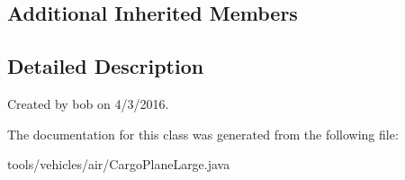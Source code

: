 \subsection*{Additional Inherited Members}


\subsection{Detailed Description}
Created by bob on 4/3/2016. 

The documentation for this class was generated from the following file\+:\begin{DoxyCompactItemize}
\item 
tools/vehicles/air/Cargo\+Plane\+Large.\+java\end{DoxyCompactItemize}
